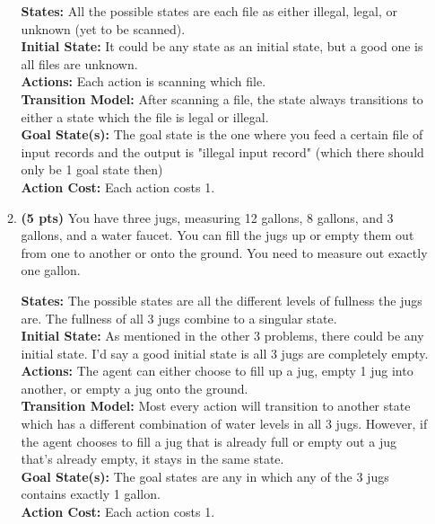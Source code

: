 \documentclass{article}
\begin{document}
\begin{enumerate}
\begin{enumerate}[label=($\alph*$)]
    \color{blue}
        \textbf{States:} All the possible states are each file as either illegal, legal, or unknown (yet to be scanned). \\
        \textbf{Initial State:} It could be any state as an initial state, but a good one is all files are unknown. \\
        \textbf{Actions:} Each action is scanning which file. \\
        \textbf{Transition Model:} After scanning a file, the state always transitions to either a state which the file is legal or illegal. \\
        \textbf{Goal State(s):} The goal state is the one where you feed a certain file of input records and the output is "illegal input record" (which there should only be 1 goal state then) \\
        \textbf{Action Cost:} Each action costs 1.
    \color{black}


    \item \textbf{(5 pts)} You have three jugs, measuring 12 gallons, 8 gallons, and 3 gallons, and a water faucet. You can fill the jugs up or empty them out from one to another or onto the ground. You need to measure out exactly one gallon.

    \color{blue}
        \textbf{States:} The possible states are all the different levels of fullness the jugs are. The fullness of all 3 jugs combine to a singular state. \\
        \textbf{Initial State:} As mentioned in the other 3 problems, there could be any initial state. I'd say a good initial state is all 3 jugs are completely empty. \\
        \textbf{Actions:} The agent can either choose to fill up a jug, empty 1 jug into another, or empty a jug onto the ground. \\
        \textbf{Transition Model:} Most every action will transition to another state which has a different combination of water levels in all 3 jugs. However, if the agent chooses to fill a jug that is already full or empty out a jug that's already empty, it stays in the same state. \\
        \textbf{Goal State(s):} The goal states are any in which any of the 3 jugs contains exactly 1 gallon. \\
        \textbf{Action Cost:} Each action costs 1.
    \color{black}


\end{enumerate}
\end{enumerate}
\end{document}
